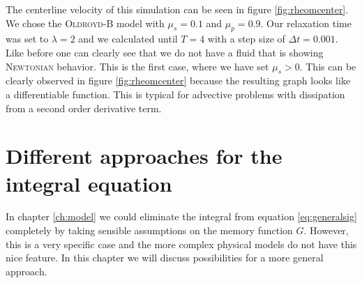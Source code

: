 \documentclass[12pt,a4paper,twoside, open=right]{scrreprt}
\theoremstyle{definition}
\theoremstyle{plain}
\begin{document}
\par The centerline velocity of this simulation can be seen in figure \ref{fig:rheomcenter}. We chose the \textsc{Oldroyd}-B model with $\mu_s=0.1$ and $\mu_p=0.9$. Our relaxation time was set to $\lambda=2$ and we calculated until $T=4$ with a step size of $\Delta t=0.001$. Like before one can clearly see that we do not have a fluid that is showing \textsc{Newtonian} behavior. This is the first case, where we have set $\mu_s>0$. This can be clearly observed in figure \ref{fig:rheomcenter} because the resulting graph looks like a differentiable function. This is typical for advective problems with dissipation from a second order derivative term.
\chapter{Different approaches for the integral equation}
In chapter \ref{ch:model} we could eliminate the integral from equation \eqref{eq:generalsig} completely by taking sensible assumptions on the memory function $G$. However, this is a very specific case and the more complex physical models do not have this nice feature. In this chapter we will discuss possibilities for a more general approach. 
\end{document}
